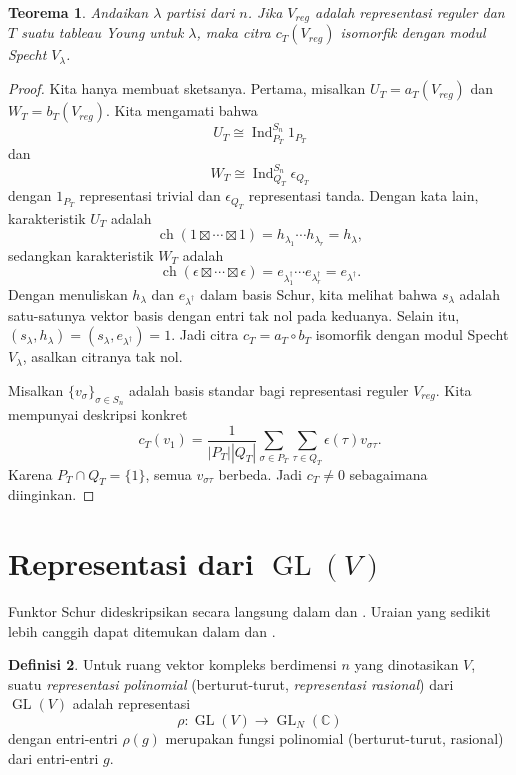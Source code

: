 \documentclass[12pt]{article}
\theoremstyle{plain}
\newtheorem{theorem}{Teorema}[section]
\theoremstyle{definition}
\newtheorem{definition}[theorem]{Definisi}
\theoremstyle{remark}
\numberwithin{equation}{section}
\begin{document}
\begin{theorem}
Andaikan $\lambda$ partisi dari $n$.
Jika $V_{reg}$ adalah representasi reguler dan $T$ suatu tableau Young
untuk $\lambda$, maka citra $c_T(V_{reg})$ isomorfik dengan
modul Specht $V_\lambda$.
\end{theorem}

\begin{proof}
Kita hanya membuat sketsanya.
Pertama, misalkan $U_T = a_T(V_{reg})$ dan $W_T = b_T(V_{reg})$.
Kita mengamati bahwa
\[
U_T \cong \operatorname{Ind}_{P_T}^{S_n} 1_{P_T}
\]
dan
\[
W_T \cong \operatorname{Ind}_{Q_T}^{S_n} \epsilon_{Q_T}
\]
dengan $1_{P_T}$ representasi trivial dan $\epsilon_{Q_T}$ representasi
tanda.
Dengan kata lain, karakteristik $U_T$ adalah
\[
\operatorname{ch}(1 \boxtimes \cdots \boxtimes 1)
= h_{\lambda_1} \cdots h_{\lambda_r} = h_\lambda,
\]
sedangkan karakteristik $W_T$ adalah
\[
\operatorname{ch}(\epsilon \boxtimes \cdots \boxtimes \epsilon)
= e_{\lambda^\dag_1} \cdots e_{\lambda^\dag_r} = e_{\lambda^\dag}.
\]
Dengan menuliskan $h_\lambda$ dan $e_{\lambda^\dag}$ dalam basis Schur,
kita melihat bahwa $s_\lambda$ adalah satu-satunya vektor basis dengan entri tak nol
pada keduanya.
Selain itu, $(s_\lambda,h_\lambda)=(s_\lambda,e_{\lambda^\dag})=1$.
Jadi citra $c_T = a_T \circ b_T$ isomorfik dengan modul Specht
$V_\lambda$, asalkan citranya tak nol.

Misalkan $\{ v_\sigma \}_{\sigma \in S_n}$ adalah basis standar bagi representasi
reguler $V_{reg}$.
Kita mempunyai deskripsi konkret
\[
c_T(v_{1})  = \frac{1}{|P_T| |Q_T|}\sum_{\sigma \in P_T}\sum_{\tau \in Q_T}
\epsilon(\tau) v_{\sigma\tau} .
\]
Karena $P_T \cap Q_T = \{1\}$, semua $v_{\sigma\tau}$ berbeda.
Jadi $c_T \ne 0$ sebagaimana diinginkan.
\end{proof}

\section{Representasi dari $\operatorname{GL}(V)$}

Funktor Schur dideskripsikan secara langsung dalam
\cite[\S{6}]{FultonHarris} dan \cite[\S{5.19,5.20-23}]{Etingof}.
Uraian yang sedikit lebih canggih dapat ditemukan dalam
\cite[Appendix 7.2]{Stanley2} dan \cite[Appendix I.A]{Macdonald}.

\begin{definition}
Untuk ruang vektor kompleks berdimensi $n$ yang dinotasikan $V$,
suatu \emph{representasi polinomial} (berturut-turut, \emph{representasi rasional}) dari
$\operatorname{GL}(V)$ adalah representasi
\[
\rho : \operatorname{GL}(V) \to \operatorname{GL}_N(\mathbb{C})
\]
dengan entri-entri $\rho(g)$ merupakan fungsi polinomial (berturut-turut, rasional)
dari entri-entri $g$.
\end{definition}
\end{document}
